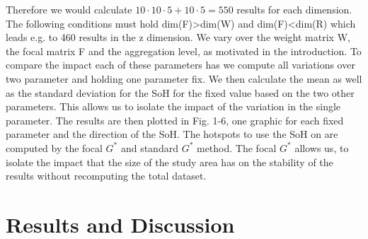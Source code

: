 \documentclass{itatnew}
\begin{document}
Therefore we would calculate $10 \cdot 10 \cdot 5 + 10 \cdot 5=550$ results for each dimension.
The following conditions must hold dim(F)>dim(W) and dim(F)<dim(R) which leads e.g. to 460 results in the z dimension.
We vary over the weight matrix W, the focal matrix F and the aggregation level, as motivated in the introduction.
To compare the impact each of these parameters has we compute all variations over two parameter and holding one parameter fix. We then calculate the mean as well as the standard deviation for the SoH for the fixed value based on the two other parameters. This allows us to isolate the impact of the variation in the single parameter. The results are then plotted in Fig. 1-6, one graphic for each fixed parameter and the direction of the SoH.
The hotspots to use the SoH on are computed by the focal $G^*$ and standard $G^*$ method. The focal $G^*$ allows us, to isolate the impact that the size of the study area has on the stability of the results without recomputing the total dataset. 





\section{Results and Discussion}

%
\end{document}
